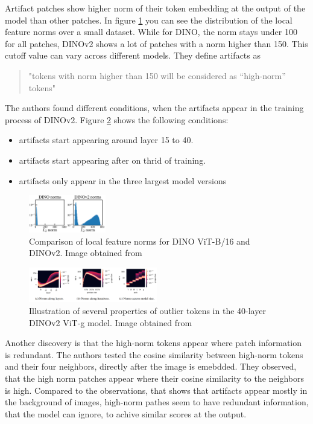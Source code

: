 \documentclass[conference]{IEEEtran}
\begin{document}
  Artifact patches show higher norm of their token embedding at the output of the model than other patches. In figure \ref{fig:artifacts-norm} you can see the distribution of the local feature norms over a small dataset. While for \mbox{DINO}, the norm stays under 100 for all patches, \mbox{DINOv2} shows a lot of patches with a norm higher than 150. This cutoff value can vary across different models. They define artifacts as
  \begin{quote}
    "tokens with norm higher than 150 will be considered as “high-norm” tokens" \cite{registers}
  \end{quote}

  The authors found different conditions, when the artifacts appear in the training process of \mbox{DINOv2}. Figure \ref{fig:artifacts-layer} shows the following conditions:
  \begin{itemize}
    \item artifacts start appearing around layer 15 to 40.
    \item artifacts start appearing after on thrid of training.
    \item artifacts only appear in the three largest model versions
  \end{itemize}

  \begin{figure}
    \centering
    \includegraphics[width=0.3\textwidth]{figures/artifact-norm.png}
    \caption{Comparison of local feature norms for \mbox{DINO} ViT-B/16 and \mbox{DINOv2}. Image obtained from \cite{registers}}
    \label{fig:artifacts-norm}
  \end{figure}
  \begin{figure}
    \centering
    \includegraphics[width=0.5\textwidth]{figures/artifact-layers.png}
    \caption{Illustration of several properties of outlier tokens in the 40-layer \mbox{DINOv2} ViT-g model. Image obtained from \cite{registers}}
    \label{fig:artifacts-layer}
  \end{figure}

  Another discovery is that the high-norm tokens appear where patch information is redundant. The authors tested the cosine similarity between high-norm tokens and their four neighbors, directly after the image is emebdded. They observed, that the high norm patches appear where their cosine similarity to the neighbors is high. Compared to the observations, that shows that artifacts appear mostly in the background of images, high-norm pathes seem to have redundant information, that the model can ignore, to achive similar scores at the output.
\end{document}
